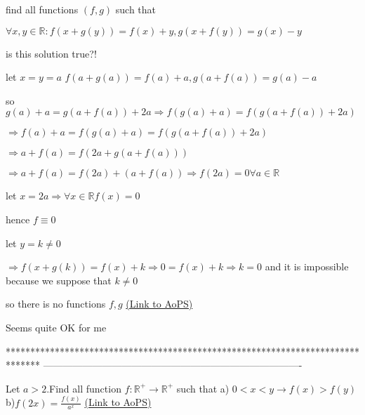 \begin{problem}
	find all functions $ (f,g) $ such that

$ \forall x,y \in \mathbb{R} : f(x+g(y))=f(x)+y , g(x+f(y))=g(x)-y $

is this solution true?!

let $ x=y=a $ $ f(a+g(a))=f(a)+a , g(a+f(a))=g(a)-a $

so $ g(a)+a=g(a+f(a))+2a \Rightarrow f(g(a)+a)=f(g(a+f(a))+2a) $

$ \Rightarrow f(a)+a=f(g(a)+a)=f(g(a+f(a))+2a) $

$ \Rightarrow a+f(a)=f(2a+g(a+f(a))) $

$ \Rightarrow a+f(a)=f(2a)+(a+f(a)) \Rightarrow f(2a)=0 \forall a \in \mathbb{R} $

let $ x=2a \Rightarrow \forall x \in \mathbb{R} f(x)=0 $

hence $ f \equiv 0 $

let $ y=k \neq 0 $

$ \Rightarrow f(x+g(k))=f(x)+k \Rightarrow 0=f(x)+k \Rightarrow k=0 $ and it is impossible because we suppose that $ k \neq 0 $

so there is no functions $ f,g $
	\flushright \href{https://artofproblemsolving.com/community/c6h585300}{(Link to AoPS)}
\end{problem}



\begin{solution}
	Seems quite OK for me
\end{solution}
*******************************************************************************
-------------------------------------------------------------------------------

\begin{problem}
	Let $a >2$.Find all function $ f:\mathbb{R}^+\to\mathbb{R}^+ $ such that
a) $0<x<y \rightarrow  f(x) > f(y)$
b)$f(2x)=\frac{f(x)}{a^{x}}$
	\flushright \href{https://artofproblemsolving.com/community/c6h585650}{(Link to AoPS)}
\end{problem}



